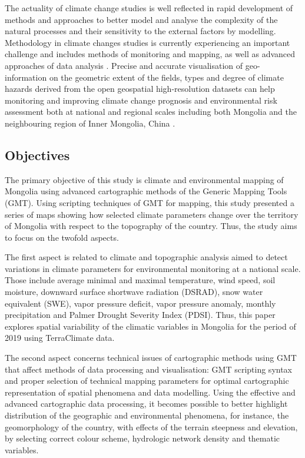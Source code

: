 \documentclass[geosciences,article,submit,pdftex,moreauthors]{Definitions/mdpi}
\begin{document}
The actuality of climate change studies is well reflected in rapid development of methods and approaches to better model and analyse the complexity of the natural processes and their sensitivity to the external factors by modelling. Methodology in climate changes studies is currently experiencing an important challenge and includes methods of monitoring and mapping, as well as advanced approaches of data analysis \cite{FENG2020102861,WANG201768,GUO2021141481}. Precise and accurate visualisation of geo-information on the geometric extent of the fields, types and degree of climate hazards derived from the open geospatial high-resolution datasets can help monitoring and improving climate change prognosis and environmental risk assessment both at national and regional scales including both Mongolia and the neighbouring region of Inner Mongolia, China \cite{JIE2021353,5631071,5964785}. 

\subsection{Objectives}
The primary objective of this study is climate and environmental mapping of Mongolia using advanced  cartographic methods of the Generic Mapping Tools (GMT). Using scripting techniques of GMT for mapping, this study presented a series of maps showing how selected climate parameters change over the territory of Mongolia with respect to the topography of the country. Thus, the study aims to focus on the twofold aspects.

The first aspect is related to climate and topographic analysis aimed to detect variations in climate parameters for environmental monitoring at a national scale. Those include average minimal and maximal temperature, wind speed, soil moisture, downward surface shortwave radiation (DSRAD), snow water equivalent (SWE), vapor pressure deficit, vapor pressure anomaly, monthly precipitation and Palmer Drought Severity Index (PDSI). Thus, this paper explores spatial variability of the climatic variables in Mongolia for the period of 2019 using TerraClimate data.

The second aspect concerns technical issues of cartographic methods using GMT that affect methods of data processing and visualisation: GMT scripting syntax and proper selection of technical mapping parameters for optimal cartographic representation of spatial phenomena and data modelling. Using the effective and advanced cartographic data processing, it becomes possible to better highlight distribution of the geographic and environmental phenomena, for instance, the geomorphology of the country, with effects of the terrain steepness and elevation, by selecting correct colour scheme, hydrologic network density and thematic variables.
\end{document}
